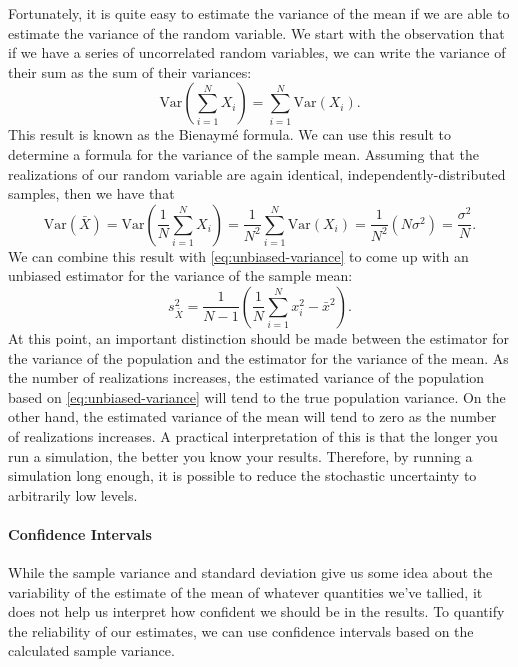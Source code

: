 Fortunately, it is quite easy to estimate the variance of the mean if we are
able to estimate the variance of the random variable. We start with the
observation that if we have a series of uncorrelated random variables, we can
write the variance of their sum as the sum of their variances:
\begin{equation}
  \label{eq:bienayme-formula}
  \text{Var} \left ( \sum_{i=1}^N X_i \right ) = \sum_{i=1}^N \text{Var} \left
  ( X_i \right ).
\end{equation}
This result is known as the Bienaymé formula. We can use this result to
determine a formula for the variance of the sample mean. Assuming that the
realizations of our random variable are again identical,
independently-distributed samples, then we have that
\begin{equation}
  \label{eq:sample-variance-mean}
  \text{Var} \left ( \bar{X} \right ) = \text{Var} \left ( \frac{1}{N}
  \sum_{i=1}^N X_i \right ) = \frac{1}{N^2} \sum_{i=1}^N \text{Var} \left (
  X_i \right ) = \frac{1}{N^2} \left ( N\sigma^2 \right ) =
  \frac{\sigma^2}{N}.
\end{equation}
We can combine this result with \eqref{eq:unbiased-variance} to come up with an
unbiased estimator for the variance of the sample mean:
\begin{equation}
  \label{eq:sample-variance-mean-formula}
  s_{\bar{X}}^2 = \frac{1}{N - 1} \left ( \frac{1}{N} \sum_{i=1}^N x_i^2 -
  \bar{x}^2 \right ).
\end{equation}
At this point, an important distinction should be made between the estimator for
the variance of the population and the estimator for the variance of the
mean. As the number of realizations increases, the estimated variance of the
population based on \eqref{eq:unbiased-variance} will tend to the true
population variance. On the other hand, the estimated variance of the mean will
tend to zero as the number of realizations increases. A practical interpretation
of this is that the longer you run a simulation, the better you know your
results. Therefore, by running a simulation long enough, it is possible to
reduce the stochastic uncertainty to arbitrarily low levels.

\paragraph{Confidence Intervals}

While the sample variance and standard deviation give us some idea about the
variability of the estimate of the mean of whatever quantities we've tallied, it
does not help us interpret how confident we should be in the results. To
quantify the reliability of our estimates, we can use confidence intervals based
on the calculated sample variance.

